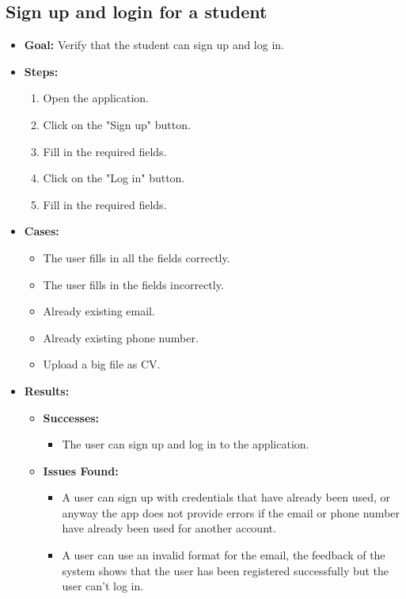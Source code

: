 \subsection{Sign up and login for a student}
\begin{itemize}
    \item \textbf{Goal:} Verify that the student can sign up and log in.

    \item \textbf{Steps:}
    \begin{enumerate}
        \item Open the application.
        \item Click on the "Sign up" button.
        \item Fill in the required fields.
        \item Click on the "Log in" button.
        \item Fill in the required fields.
    \end{enumerate}
    \item \textbf{Cases:}
    \begin{itemize}
        \item The user fills in all the fields correctly.
        \item The user fills in the fields incorrectly.
        \item Already existing email.
        \item Already existing phone number.
        \item Upload a big file as CV.
    \end{itemize}
    \item \textbf{Results:}
    \begin{itemize}
        \item \textbf{Successes:}
        \begin{itemize}
            \item The user can sign up and log in to the application.
        \end{itemize}
        \item \textbf{Issues Found:}
        \begin{itemize}
            \item A user can sign up with credentials that have already been used, or anyway the app does not provide errors if the email or
                phone number have already been used for another account.
            \item A user can use an invalid format for the email, the feedback of the system shows that the user has been registered successfully
                but the user can't log in.
        \end{itemize}
    \end{itemize}
\end{itemize}


